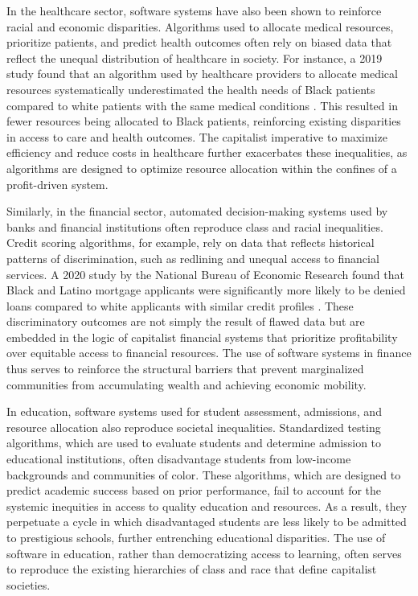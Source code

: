In the healthcare sector, software systems have also been shown to reinforce racial and economic disparities. Algorithms used to allocate medical resources, prioritize patients, and predict health outcomes often rely on biased data that reflect the unequal distribution of healthcare in society. For instance, a 2019 study found that an algorithm used by healthcare providers to allocate medical resources systematically underestimated the health needs of Black patients compared to white patients with the same medical conditions \cite[pp.~447-448]{obermeyer2019}. This resulted in fewer resources being allocated to Black patients, reinforcing existing disparities in access to care and health outcomes. The capitalist imperative to maximize efficiency and reduce costs in healthcare further exacerbates these inequalities, as algorithms are designed to optimize resource allocation within the confines of a profit-driven system.

Similarly, in the financial sector, automated decision-making systems used by banks and financial institutions often reproduce class and racial inequalities. Credit scoring algorithms, for example, rely on data that reflects historical patterns of discrimination, such as redlining and unequal access to financial services. A 2020 study by the National Bureau of Economic Research found that Black and Latino mortgage applicants were significantly more likely to be denied loans compared to white applicants with similar credit profiles \cite[pp.~9-11]{bartlett2020}. These discriminatory outcomes are not simply the result of flawed data but are embedded in the logic of capitalist financial systems that prioritize profitability over equitable access to financial resources. The use of software systems in finance thus serves to reinforce the structural barriers that prevent marginalized communities from accumulating wealth and achieving economic mobility.

In education, software systems used for student assessment, admissions, and resource allocation also reproduce societal inequalities. Standardized testing algorithms, which are used to evaluate students and determine admission to educational institutions, often disadvantage students from low-income backgrounds and communities of color. These algorithms, which are designed to predict academic success based on prior performance, fail to account for the systemic inequities in access to quality education and resources. As a result, they perpetuate a cycle in which disadvantaged students are less likely to be admitted to prestigious schools, further entrenching educational disparities. The use of software in education, rather than democratizing access to learning, often serves to reproduce the existing hierarchies of class and race that define capitalist societies.

